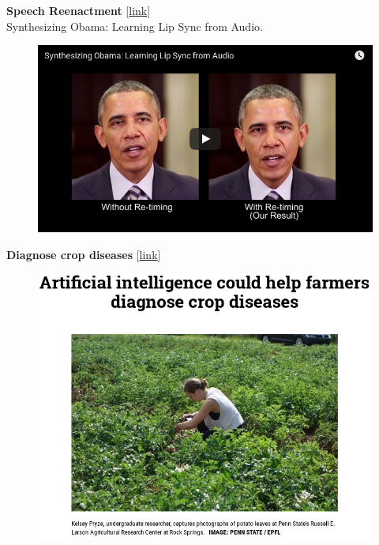 \documentclass[10pt, compress]{beamer}
\begin{document}
\begin{frame}
  \vspace{.6cm}
  \textbf{Speech Reenactment} [\href{https://grail.cs.washington.edu/projects/AudioToObama/}{link}] \\
  \small{Synthesizing Obama: Learning Lip Sync from Audio.} \\

  \vspace{.6cm}
  \begin{figure}
    \includegraphics[width=1\linewidth]{imgs/edx_dl_keras/6}
  \end{figure}
\end{frame}

\begin{frame}
  \vspace{.6cm}
  \textbf{Diagnose crop diseases} [\href{https://www.youtube.com/watch?v=NlpS-DhayQA}{link}] \\

  \vspace{.6cm}
  \begin{figure}
    \includegraphics[width=.7\linewidth]{imgs/edx_dl_keras/7}
  \end{figure}
\end{frame}
\end{document}
